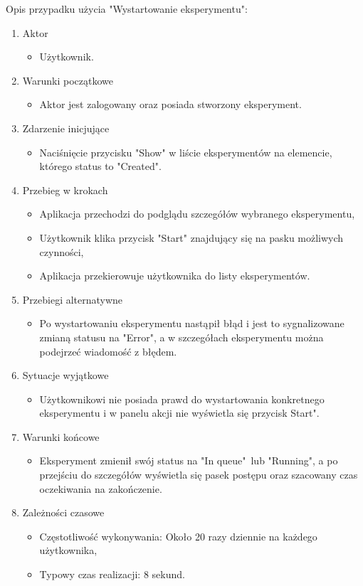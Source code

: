 Opis przypadku użycia "Wystartowanie eksperymentu":
\begin{enumerate}
	\item  Aktor
	\begin{itemize}
		\item Użytkownik. 
	\end{itemize}
	\item Warunki początkowe
	\begin{itemize}
		\item Aktor jest zalogowany oraz posiada stworzony eksperyment.
	\end{itemize}
	\item Zdarzenie inicjujące
	\begin{itemize}
		\item Naciśnięcie przycisku "Show" w liście eksperymentów na elemencie, którego status to "Created".
	\end{itemize}
	\item Przebieg w krokach
	\begin{itemize}
		\item Aplikacja przechodzi do podglądu szczegółów wybranego eksperymentu,
		\item Użytkownik klika przycisk "Start" znajdujący się na pasku możliwych czynności,
		\item Aplikacja przekierowuje użytkownika do listy eksperymentów.
	\end{itemize}
	\item Przebiegi alternatywne
	\begin{itemize}
		\item  Po wystartowaniu eksperymentu nastąpił błąd i jest to sygnalizowane zmianą statusu na "Error", a w szczegółach eksperymentu można podejrzeć wiadomość z błędem.
	\end{itemize}
	\item Sytuacje wyjątkowe
	\begin{itemize}
		\item  Użytkownikowi nie posiada prawd do wystartowania konkretnego eksperymentu i w panelu akcji nie wyświetla się przycisk Start".
	\end{itemize}
	\item Warunki końcowe
	\begin{itemize}
		\item  Eksperyment zmienił swój status na "In queue"\ lub "Running", a po przejściu do szczegółów wyświetla się pasek postępu oraz szacowany czas oczekiwania na zakończenie.
	\end{itemize}
	\item Zależności czasowe
	\begin{itemize}
		\item Częstotliwość wykonywania: Około 20 razy dziennie na każdego użytkownika,
		\item Typowy czas realizacji: 8 sekund.
	\end{itemize}
\end{enumerate}

